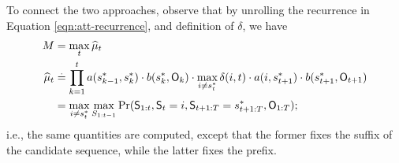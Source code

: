 To connect the two approaches, observe that by unrolling the recurrence in Equation \ref{eqn:att-recurrence}, and definition of $\delta$, we have
\begin{align*}
	M &= \max_t \widehat{\mu}_t \\
	\widehat{\mu}_{t} &\stackrel{.}{=} \prod_{k = 1}^t a( s^*_{k-1}, s^*_{k} ) \cdot b( s^*_{k}, \mathsf{O}_{k} ) \cdot \max_{i \neq s^*_{t}} \delta(i, t) \cdot a( i, s^*_{t+1} ) \cdot b( s^*_{t+1}, \mathsf{O}_{t+1} ) \\
	&= \max_{i \neq s^*_{t}} \max_{S_{1:t-1}} {\Pr( \mathsf{S}_{1:t}, \mathsf{S}_t = i, \mathsf{S}_{t+1:T} = s^*_{t+1:T}, \mathsf{O}_{1:T} )};
\end{align*}
i.e., the same quantities are computed, except that the former fixes the suffix of the candidate sequence, while the latter fixes the prefix.
